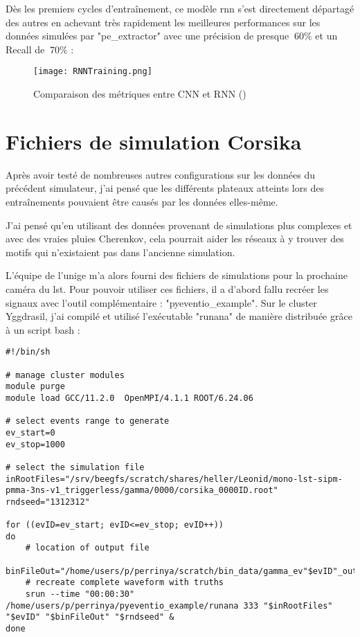 Dès les premiers cycles d'entraînement, ce modèle \gls{rnn} s'est directement départagé des autres en achevant
très rapidement les meilleures performances sur les données simulées par "pe\_extractor" avec une précision de 
presque $~60\%$ et un Recall de $~70\%$ :
\newpage
\begin{figure}[tbph!]
	\centering
	\texttt{[image: RNNTraining.png]}
	\caption[Comparaison des métriques entre CNN et RNN]{Comparaison des métriques entre CNN et RNN ()}
\end{figure}

\section{Fichiers de simulation Corsika}
Après avoir testé de nombreuses autres configurations sur les données du précédent simulateur, j'ai pensé que 
les différents plateaux atteints lors des entraînements pouvaient être causés par les données elles-même.

J'ai pensé qu'en utilisant des données provenant de simulations plus complexes et 
avec des vraies pluies Cherenkov, cela pourrait aider les réseaux à y trouver des 
motifs qui n'existaient pas dans l'ancienne simulation.

L'équipe de l'\gls{unige} m'a alors fourni des fichiers de simulations pour la prochaine caméra du \gls{lst}.
Pour pouvoir utiliser ces fichiers, il a d'abord fallu recréer les signaux avec l'outil complémentaire : "pyeventio\_example".
Sur le cluster Yggdrasil, j'ai compilé et utilisé l'exécutable "runana" de manière distribuée grâce à un script bash :

\begin{lstlisting}[language=iBash,caption={Script de génération des signaux à partir de fichier de simulations, data/slurm-run.sh},captionpos=b]
#!/bin/sh

# manage cluster modules
module purge
module load GCC/11.2.0  OpenMPI/4.1.1 ROOT/6.24.06

# select events range to generate
ev_start=0
ev_stop=1000

# select the simulation file
inRootFiles="/srv/beegfs/scratch/shares/heller/Leonid/mono-lst-sipm-pmma-3ns-v1_triggerless/gamma/0000/corsika_0000ID.root"
rndseed="1312312"

for ((evID=ev_start; evID<=ev_stop; evID++))
do
	# location of output file
	binFileOut="/home/users/p/perrinya/scratch/bin_data/gamma_ev"$evID"_out.bin"
	# recreate complete waveform with truths
	srun --time "00:00:30" /home/users/p/perrinya/pyeventio_example/runana 333 "$inRootFiles" "$evID" "$binFileOut" "$rndseed" &
done
\end{lstlisting}

